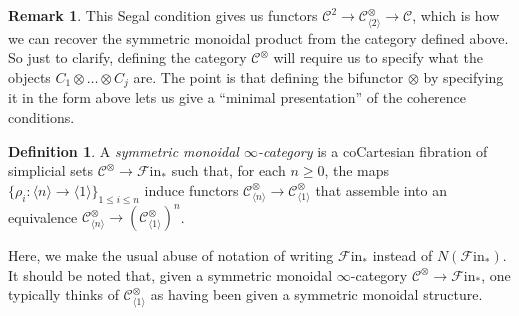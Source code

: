 \documentclass[letterpaper]{article}
\theoremstyle{definition}
\newtheorem{definition}[lemma]{Definition}
\newtheorem{remark}[lemma]{Remark}
\newcommand{\mc}{\mathcal}
\begin{document}
\begin{remark}
This Segal condition gives us functors $\mc C^2 \rightarrow \mc
C^{\otimes}_{\langle 2 \rangle} \xrightarrow{} \mc C$, which is how we
can recover the symmetric monoidal product from the category defined
above. So just to clarify, defining the category $\mc C^\otimes$ will
require us to specify what the objects $ C_1 \otimes \dots \otimes
C_j$ are. The point is that defining the bifunctor $\otimes$ by
specifying it in the form above lets us give a ``minimal
presentation'' of the coherence conditions.
\end{remark}

\begin{definition}
    A \emph{symmetric monoidal $\infty$-category} is a coCartesian fibration of simplicial sets $\mathcal{C}^\otimes \to \mathscr{F}\mathrm{in}_*$ such that, for each $n \geq 0$, the maps $\{\rho_i : \langle n \rangle \to \langle 1 \rangle \}_{1 \leq i \leq n}$ induce functors $\mathcal{C}^\otimes_{\langle n \rangle} \to \mathcal{C}^\otimes_{\langle 1 \rangle}$ that assemble into an equivalence $\mathcal{C}^\otimes_{\langle n \rangle} \to (\mathcal{C}^\otimes_{\langle 1 \rangle})^n$.
\end{definition}

Here, we make the usual abuse of notation of writing $\mathscr{F}\mathrm{in}_*$ instead of $N(\mathscr{F}\mathrm{in}_*)$. It should be noted that, given a symmetric monoidal $\infty$-category $\mathcal{C}^\otimes \to \mathscr{F}\mathrm{in}_*$, one typically thinks of $\mathcal{C}^\otimes_{\langle 1 \rangle}$ as having been given a symmetric monoidal structure.
\end{document}
